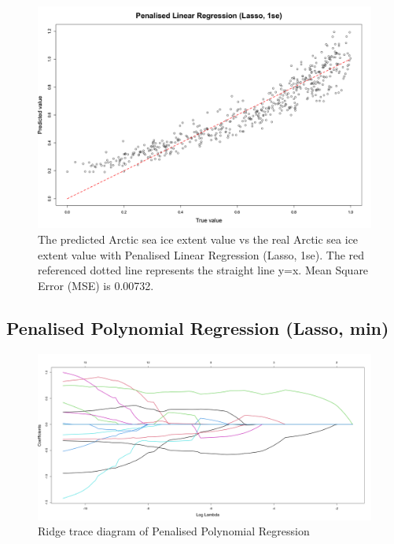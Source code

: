 \begin{figure}[htbp]
\centering
\includegraphics[width = 1.0\textwidth]{Figure/4.2.3-PLR-1se.png}
\caption{The predicted Arctic sea ice extent value vs the real Arctic sea ice extent value with Penalised Linear Regression (Lasso, 1se). The red referenced dotted line represents the straight line y=x. Mean Square Error (MSE) is 0.00732.}
\label{4.2.3-PLR-1se}
\end{figure}



\subsection{Penalised Polynomial Regression (Lasso, min)} %

\begin{figure}[htbp]
\centering
\includegraphics[width = 1.0\textwidth]{Figure/4.2.4-PPR-ridge-trance.png}
\caption{Ridge trace diagram of Penalised Polynomial Regression}
\label{4.2.4-PPR-ridge-trance}
\end{figure}

